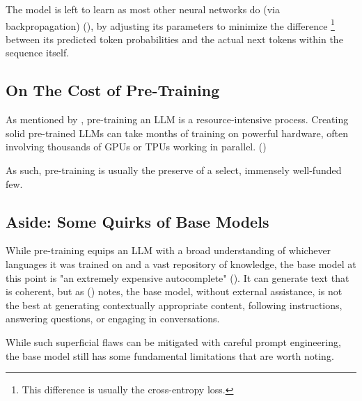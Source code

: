 \documentclass{article} %
\begin{document}
The model is left to learn as most other neural networks do (via backpropagation) (\cite{Karpathy-2025}),
by adjusting its parameters to minimize the difference \footnote{
    This difference is usually the cross-entropy loss.
} between its predicted token probabilities and the actual next tokens
within the sequence itself.

\subsection{On The Cost of Pre-Training}
As mentioned by \cite{Karpathy-2025}, pre-training an LLM is a resource-intensive process.
Creating solid pre-trained LLMs can take months of training on powerful hardware,
often involving thousands of GPUs or TPUs working in parallel. (\cite{Alibaba-2025,Anthropic-2025,ChatGPT-2022,Deepseek-2024,Google-2025,Meta-2023})

As such, pre-training is usually the preserve of a select, immensely well-funded few.

\subsection{Aside: Some Quirks of Base Models}
While pre-training equips an LLM with a broad understanding of whichever languages it was trained on
and a vast repository of knowledge, the base model at this point is "an extremely expensive autocomplete" (\cite{Karpathy-2025}).
It can generate text that is coherent, but as (\cite{Karpathy-2025}) notes, 
the base model, without external assistance, is not the best at generating contextually appropriate content,
following instructions, answering questions, or engaging in conversations.

While such superficial flaws can be mitigated with careful prompt engineering,
the base model still has some fundamental limitations that are worth noting.
\end{document}
